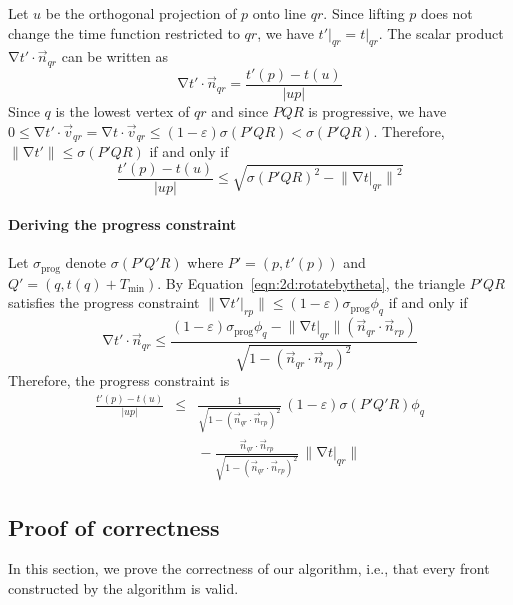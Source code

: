 \documentclass[twocolumn]{article}
\def\S{\ensuremath{\sigma}}
\def\minT{\ensuremath{T_{\text{min}}}}
\def\progS{\ensuremath{\S_{\text{prog}}}}
\def\e{\ensuremath{\varepsilon}}
\def\fp{\ensuremath{P}}
\def\fq{\ensuremath{Q}}
\def\fr{\ensuremath{R}}
\DeclareMathOperator{\grad}{\ensuremath{\nabla}}
\def\abs#1{\ensuremath{\mathopen| #1 \mathclose|}}
\def\norm#1{\ensuremath{\mathopen\| #1 \mathclose\|}}
\def\rest#1#2{\ensuremath{\left. #1 \right|_{#2}}}
\begin{document}
Let $u$ be the orthogonal projection of $p$ onto line $qr$.
Since lifting $p$ does not change the time function
restricted to $qr$, we have $\rest{t'}{qr} =
\rest{t}{qr}$.  The scalar product~$\grad t' \cdot \vec{n}_{qr}$ can be
written as
\[
  \grad t' \cdot \vec{n}_{qr}
=
  \frac{t'(p)-t(u)}{\abs{up}}
\]
Since $q$ is the lowest vertex of $qr$ and since
$\fp\fq\fr$ is progressive, we have $0 \le \grad t'
\cdot \vec{v}_{qr} = \grad t \cdot \vec{v}_{qr} \le (1-\e)
\S(\fp'\fq\fr) < \S(\fp'\fq\fr)$.
Therefore, $\norm{\grad t'} \le
\S(\fp'\fq\fr)$ if and only if
\begin{equation}\boxed{\frac{t'(p) - t(u)}{\abs{up}}
\le 
  \sqrt{\S(\fp'\fq\fr)^2 - \norm{\grad \rest{t}{qr}}^2}
\label{eqn:2d:causalityconstraint}
}\end{equation}


\paragraph{Deriving the progress constraint}

Let $\progS$ denote $\S(\fp'\fq'\fr)$ where $\fp'=(p,t'(p))$ and
$\fq'=(q,t(q)+\minT)$.  By Equation~\ref{eqn:2d:rotatebytheta}, the
triangle $\fp'\fq\fr$ satisfies the progress constraint $\norm{\grad
  \rest{t'}{rp}} \le (1-\e) \progS \phi_q$ if and only if
\[
  \grad t' \cdot \vec{n}_{qr}
\le
  \frac{(1-\e) \progS \phi_q
        - \norm{\grad \rest{t}{qr}} (\vec{n}_{qr} \cdot \vec{n}_{rp})}
       {\sqrt{1 - (\vec{n}_{qr} \cdot \vec{n}_{rp})^2}}
\]
Therefore, the progress constraint is
\begin{equation}\boxed{\begin{array}{rcl}
  \frac{t'(p) - t(u)}{\abs{up}}
&\le&
  \frac{1}{\sqrt{1 - (\vec{n}_{qr} \cdot \vec{n}_{rp})^2}}
  \, (1-\e) \S(\fp'\fq'\fr) \phi_q \\[2ex]
&&
  {}-{} \frac{\vec{n}_{qr} \cdot \vec{n}_{rp}}
             {\sqrt{1 - (\vec{n}_{qr} \cdot \vec{n}_{rp})^2}} 
  \, \norm{\grad \rest{t}{qr}}
\end{array}
\label{eqn:2d:progressconstraint}
}\end{equation}




\subsection{Proof of correctness}

In this section, we prove the correctness of our algorithm, i.e., that
every front constructed by the algorithm is valid.
\end{document}
